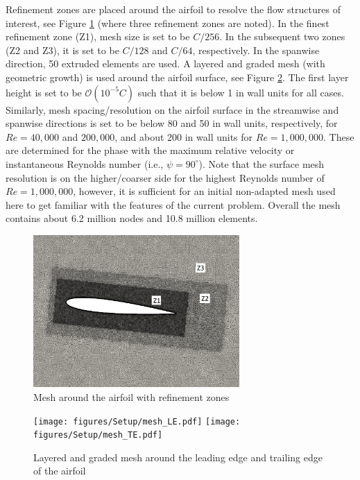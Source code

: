 Refinement zones are placed around the airfoil to resolve the flow structures of interest, see Figure \ref{fig:mesh} (where three refinement zones are noted).
In the finest refinement zone (Z1), mesh size is set to be $C/256$.
In the subsequent two zones (Z2 and Z3), it is set to be $C/128$ and $C/64$, respectively.
In the spanwise direction, 50 extruded elements are used.
A layered and graded mesh (with geometric growth) is used around the airfoil surface, see Figure \ref{fig:mesh2}.
The first layer height is set to be $\mathcal{O}(10^{-5} C)$ such that it is below 1 in wall units for all cases.
Similarly, mesh spacing/resolution on the airfoil surface in the streamwise and spanwise directions is set to be below 80 and 50 in wall units, respectively, for $Re=40,000$ and $200,000$, and about 200 in wall units for $Re=1,000,000$. These are determined for the phase with the maximum relative velocity or instantaneous Reynolds number (i.e., $\psi=90^\circ$). Note that the surface mesh resolution is on the higher/coarser side for the highest Reynolds number of $Re=1,000,000$, however, it is sufficient for an initial non-adapted mesh used here to get familiar with the features of the current problem.
Overall the mesh contains about 6.2 million nodes and 10.8 million elements.

\begin{figure}[H]
\centering
\includegraphics[width=0.7\textwidth]{figures/Setup/mesh_screenshot.pdf}
\caption{Mesh around the airfoil with refinement zones}
\label{fig:mesh}
\end{figure}

\begin{figure}[H]
\centering
\texttt{[image: figures/Setup/mesh\_LE.pdf]}
\texttt{[image: figures/Setup/mesh\_TE.pdf]}
\caption{Layered and graded mesh around the leading edge and trailing edge of the airfoil}
\label{fig:mesh2}
\end{figure}

